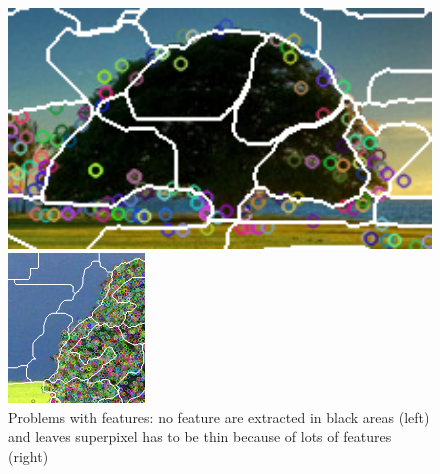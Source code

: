 \documentclass[a4paper,titlepaget]{article}
\begin{document}
\begin{figure}[htpb] 
	\centering
	\begin{minipage}{.3\textwidth}
		\includegraphics[width=1.2\textwidth]{images/black_tree} 
	\end{minipage}
	\hspace{.15\textwidth}
	\begin{minipage}{.3\textwidth}
		\includegraphics[width=\textwidth]{images/leaves}
	\end{minipage}  
	\caption{\centering Problems with features: no feature are extracted in black areas (left) and leaves superpixel has to be thin because of lots of features (right)}
\end{figure}
\end{document}
